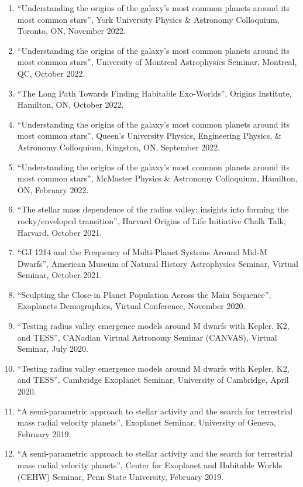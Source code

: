 \documentclass[12pt]{article}
\begin{document}
\begin{enumerate}
\item ``Understanding the origins of the galaxy’s most common planets around its most common stars'', York University Physics \& Astronomy Colloquium, Toronto, ON, November 2022.
\item ``Understanding the origins of the galaxy’s most common planets around its most common stars'', University of Montreal Astrophysics Seminar, Montreal, QC, October 2022.
\item ``The Long Path Towards Finding Habitable Exo-Worlds'', Origins Institute, Hamilton, ON, October 2022.
\item ``Understanding the origins of the galaxy’s most common planets around its most common stars'', Queen's University Physics, Engineering Physics, \& Astronomy Colloquium, Kingston, ON, September 2022.
\item ``Understanding the origins of the galaxy’s most common planets around its most common stars'', McMaster Physics \& Astronomy Colloquium, Hamilton, ON, February 2022.
\item ``The stellar mass dependence of the radius valley: insights into forming the rocky/enveloped transition'', Harvard Origins of Life Initiative Chalk Talk, Harvard, October 2021.
\item ``GJ 1214 and the Frequency of Multi-Planet Systems Around Mid-M Dwarfs'', American Museum of Natural History Astrophysics Seminar, Virtual Seminar, October 2021.
\item ``Sculpting the Close-in Planet Population Across the Main Sequence'', Exoplanets Demographics, Virtual Conference, November 2020.
\item ``Testing radius valley emergence models around M dwarfs with Kepler, K2, and TESS'', CANadian Virtual Astronomy Seminar (CANVAS), Virtual Seminar, July 2020.
\item ``Testing radius valley emergence models around M dwarfs with Kepler, K2, and TESS'', Cambridge Exoplanet Seminar, University of Cambridge, April 2020.
\item ``A semi-parametric approach to stellar activity and the search for terrestrial mass radial velocity planets'', Exoplanet Seminar, University of Geneva, February 2019.
\item ``A semi-parametric approach to stellar activity and the search for terrestrial mass radial velocity planets'', Center for Exoplanet and Habitable Worlds (CEHW) Seminar, Penn State University, February 2019.
\end{enumerate}
\end{document}
